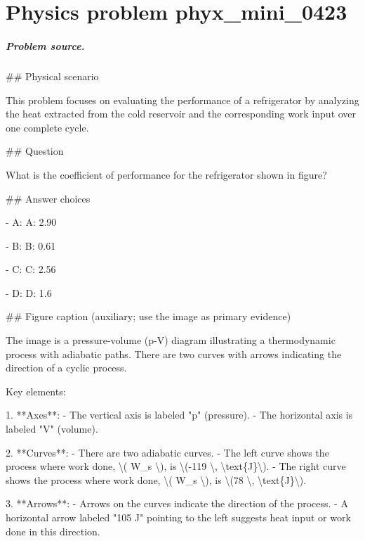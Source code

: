 
\chapter{Physics problem phyx\_mini\_0423}
\label{ch:PhyXMiniProblems_problem_phyx_mini_0423}

\paragraph{Problem source.}
\#\# Physical scenario

This problem focuses on evaluating the performance of a refrigerator by analyzing the heat extracted from the cold reservoir and the corresponding work input over one complete cycle.

\#\# Question

What is the coefficient of performance for the refrigerator shown in figure?

\#\# Answer choices

- A: A: 2.90

- B: B: 0.61

- C: C: 2.56

- D: D: 1.6

\#\# Figure caption (auxiliary; use the image as primary evidence)

The image is a pressure-volume (p-V) diagram illustrating a thermodynamic process with adiabatic paths. There are two curves with arrows indicating the direction of a cyclic process. 

Key elements:

1. **Axes**:
   - The vertical axis is labeled "p" (pressure).
   - The horizontal axis is labeled "V" (volume).

2. **Curves**:
   - There are two adiabatic curves.
   - The left curve shows the process where work done, \textbackslash{}( W\_s \textbackslash{}), is \textbackslash{}(-119 \textbackslash{}, \textbackslash{}text\{J\}\textbackslash{}).
   - The right curve shows the process where work done, \textbackslash{}( W\_s \textbackslash{}), is \textbackslash{}(78 \textbackslash{}, \textbackslash{}text\{J\}\textbackslash{}).

3. **Arrows**:
   - Arrows on the curves indicate the direction of the process.
   - A horizontal arrow labeled "105 J" pointing to the left suggests heat input or work done in this direction.

